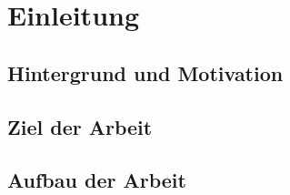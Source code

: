 \section{Einleitung}
\subsection{Hintergrund und Motivation}%


\subsection{Ziel der Arbeit}


\subsection{Aufbau der Arbeit}

